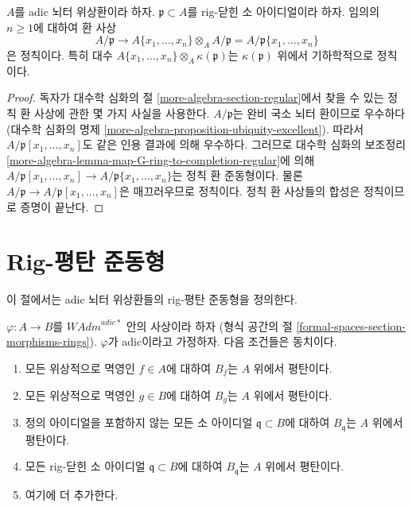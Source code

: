 \begin{lemma}
\label{lemma-fibre-regular}
$A$를 adic 뇌터 위상환이라 하자.
$\mathfrak p \subset A$를 rig-닫힌 소 아이디얼이라 하자.
임의의 $n \geq 1$에 대하여 환 사상
$$
A/\mathfrak p
\longrightarrow
A\{x_1, \ldots, x_n\} \otimes_A A/\mathfrak p =
A/\mathfrak p\{x_1, \ldots, x_n\}
$$
은 정칙이다. 특히 대수
$A\{x_1, \ldots, x_n\} \otimes_A \kappa(\mathfrak p)$는
$\kappa(\mathfrak p)$ 위에서 기하학적으로 정칙이다.
\end{lemma}

\begin{proof}
독자가 대수학 심화의 절 \ref{more-algebra-section-regular}에서 찾을 수 있는
정칙 환 사상에 관한 몇 가지 사실을 사용한다.
$A/\mathfrak p$는 완비 국소 뇌터 환이므로 우수하다
(대수학 심화의 명제 \ref{more-algebra-proposition-ubiquity-excellent}).
따라서 $A/\mathfrak p[x_1, \ldots, x_n]$도 같은 인용 결과에 의해 우수하다.
그러므로 대수학 심화의 보조정리
\ref{more-algebra-lemma-map-G-ring-to-completion-regular}에 의해
$A/\mathfrak p[x_1, \ldots, x_n] \to
A/\mathfrak p\{x_1, \ldots, x_n\}$는 정칙 환 준동형이다.
물론 $A/\mathfrak p \to A/\mathfrak p[x_1, \ldots, x_n]$은
매끄러우므로 정칙이다. 정칙 환 사상들의 합성은 정칙이므로 증명이 끝난다.
\end{proof}


\section{Rig-평탄 준동형}
\label{section-rig-flat-homomorphisms}

\noindent
이 절에서는 adic 뇌터 위상환들의 rig-평탄 준동형을 정의한다.

\begin{lemma}
\label{lemma-naively-rig-flat-continuous}
$\varphi : A \to B$를 $\textit{WAdm}^{adic*}$ 안의 사상이라 하자
(형식 공간의 절 \ref{formal-spaces-section-morphisms-rings}).
$\varphi$가 adic이라고 가정하자. 다음 조건들은 동치이다.
\begin{enumerate}
\item 모든 위상적으로 멱영인 $f \in A$에 대하여 $B_f$는 $A$ 위에서 평탄이다.
\item 모든 위상적으로 멱영인 $g \in B$에 대하여 $B_g$는 $A$ 위에서 평탄이다.
\item 정의 아이디얼을 포함하지 않는 모든 소 아이디얼
$\mathfrak q \subset B$에 대하여 $B_\mathfrak q$는 $A$ 위에서 평탄이다.
\item 모든 rig-닫힌 소 아이디얼 $\mathfrak q \subset B$에 대하여
$B_\mathfrak q$는 $A$ 위에서 평탄이다.
\item 여기에 더 추가한다.
\end{enumerate}
\end{lemma}

